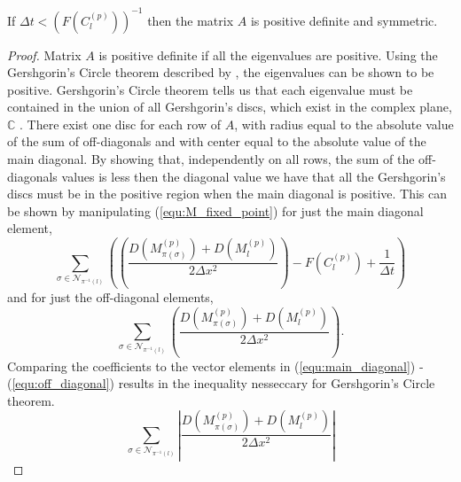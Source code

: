 \begin{prop} \label{prop:pos_sym}
 If $ \Delta t < \left( { F(C^{(p)}_{l}) } \right)^{-1}$ then the matrix $A$ is positive definite and symmetric.
\end{prop}
\begin{proof}
  Matrix $A$ is positive definite if all the eigenvalues are positive. 
  Using the Gershgorin's Circle theorem described by \cite{varga2004gersgorin}, the eigenvalues can be shown to be positive.
  Gershgorin's Circle theorem tells us that each eigenvalue must be contained in the union of all Gershgorin's discs, which exist in the complex plane, $\mathbb{C}$ \citep{varga2004gersgorin}.
  There exist one disc for each row of $A$, with radius equal to the absolute value of the sum of off-diagonals and with center equal to the absolute value of the main diagonal.
  By showing that, independently on all rows, the sum of the off-diagonals values is less then the diagonal value we have that all the Gershgorin's discs must be in the positive region when the main diagonal is positive.
  This can be shown by manipulating (\ref{equ:M_fixed_point}) for just the main diagonal element,
  \begin{equation} \label{equ:main_diagonal}
    \sum_{\sigma \in \mathcal{N}_{\pi^{-1}(l)}} \left( 
      \left( \frac{D(M_{\pi(\sigma)}^{(p)}) + D(M_l^{(p)})}{2\Delta x^2} \right)
      - F(C_l^{(p)}) + \frac{1}{\Delta t} \right)
  \end{equation}
  and for just the off-diagonal elements,
  \begin{equation} \label{equ:off_diagonal}
    \sum_{\sigma \in \mathcal{N}_{\pi^{-1}(l)}}
      \left( \frac{D(M_{\pi(\sigma)}^{(p)}) + D(M_l^{(p)})}{2\Delta x^2} \right).
  \end{equation}
  Comparing the coefficients to the vector elements in (\ref{equ:main_diagonal}) - (\ref{equ:off_diagonal}) results in the inequality nesseccary for Gershgorin's Circle theorem.
  \begin{equation} \label{equ:diagonalGreatOffdiagonal}
    \sum_{\sigma \in \mathcal{N}_{\pi^{-1}(l)}} \left|
      \frac{D(M_{\pi(\sigma)}^{(p)}) + D(M_l^{(p)})}{2\Delta x^2} 
      \right| 

\end{equation}
\end{proof}
